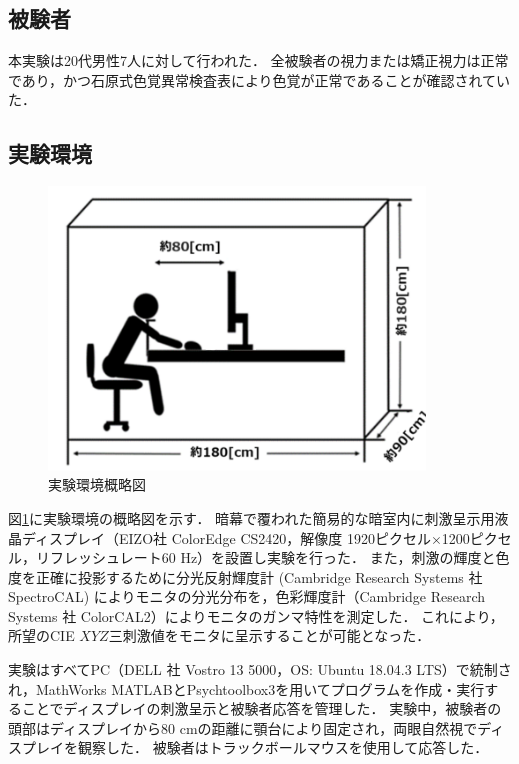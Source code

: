         \subsection{被験者}
            本実験は20代男性7人に対して行われた．
            全被験者の視力または矯正視力は正常であり，かつ石原式色覚異常検査表により色覚が正常であることが確認されていた．

        \subsection{実験環境}

            \begin{figure}[h]
                \centering
                \includegraphics[width=10.0cm]{./img/darkroom_p.png}
                \caption{実験環境概略図}
                \label{darkroom}
            \end{figure}
            
            図\ref{darkroom}に実験環境の概略図を示す．
            暗幕で覆われた簡易的な暗室内に刺激呈示用液晶ディスプレイ（EIZO社 ColorEdge CS2420，解像度 1920ピクセル$\times$1200ピクセル，リフレッシュレート60 Hz）を設置し実験を行った．
            また，刺激の輝度と色度を正確に投影するために分光反射輝度計 (Cambridge Research Systems 社 SpectroCAL) によりモニタの分光分布を，色彩輝度計（Cambridge Research Systems 社 ColorCAL2）によりモニタのガンマ特性を測定した．
            これにより，所望のCIE $XYZ$三刺激値をモニタに呈示することが可能となった．
            
            実験はすべてPC（DELL 社 Vostro 13 5000，OS: Ubuntu 18.04.3 LTS）で統制され，MathWorks MATLABとPsychtoolbox3\cite{Psychtoolbox}を用いてプログラムを作成・実行することでディスプレイの刺激呈示と被験者応答を管理した．
            実験中，被験者の頭部はディスプレイから80 cmの距離に顎台により固定され，両眼自然視でディスプレイを観察した．
            被験者はトラックボールマウスを使用して応答した．

